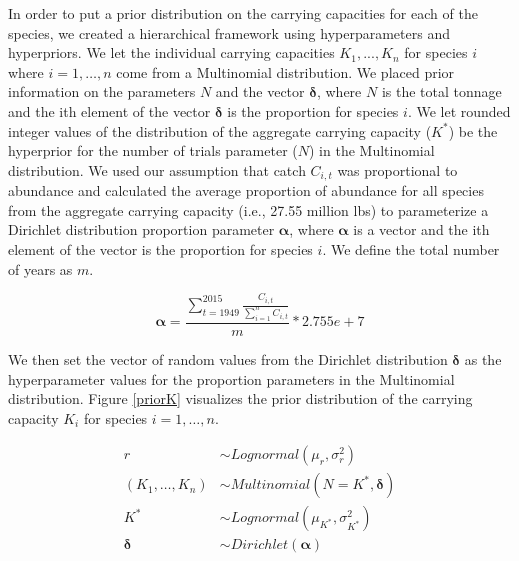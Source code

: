 \documentclass[oneside,12pt,final]{sty/ucthesis-CA2012}
\begin{document}
\begin{mainmatter}
In order to put a prior distribution on the carrying capacities for each of the species, we created a hierarchical framework using hyperparameters and hyperpriors. We let the individual carrying capacities $K_1,...,K_n$ for species $i$ where $i=1,\dots,n$ come from a Multinomial distribution. We placed prior information on the parameters $N$ and the vector $\boldsymbol{\delta}$, where $N$ is the total tonnage and the ith element of the vector $\boldsymbol{\delta}$ is the proportion for species $i$. We let rounded integer values of the distribution of the aggregate carrying capacity ($K^*$) be the hyperprior for the number of trials parameter ($N$) in the Multinomial distribution. We used our assumption that catch $C_{i,t}$ was proportional to abundance and calculated the average proportion of abundance for all species from the aggregate carrying capacity (i.e., 27.55 million lbs) to parameterize a Dirichlet distribution proportion parameter $\boldsymbol{\alpha}$, where $\boldsymbol{\alpha}$ is a vector and the ith element of the vector is the proportion for species $i$. We define the total number of years as $m$.

\begin{equation*}
\boldsymbol{\alpha} = \frac{\sum_{t=1949}^{2015}\frac{C_{i,t}}{\sum_{i=1}^{n}C_{i,t}}}{m}*2.755e+7
\end{equation*}

We then set the vector of random values from the Dirichlet distribution $\boldsymbol{\delta}$ as the hyperparameter values for the proportion parameters in the Multinomial distribution. Figure \ref{priorK} visualizes the prior distribution of the carrying capacity $K_i$ for species $i=1,\dots,n$.

\begin{align*}
r & \sim Lognormal(\mu_r, \sigma_r^2) \\
(K_1,\dots,K_n) & \sim Multinomial(N=K^*, \boldsymbol{\delta}) \\
K^* & \sim Lognormal(\mu_{K^*}, \sigma_{K^*}^2) \\
\boldsymbol{\delta} & \sim Dirichlet(\boldsymbol{\alpha})
\end{align*}


\end{mainmatter}
\end{document}
